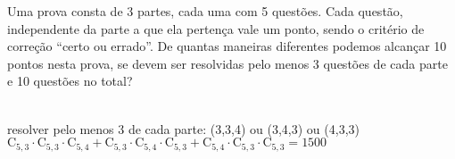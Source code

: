 \begin{ex}
Uma prova consta de 3 partes, cada uma com 5 questões. Cada questão, independente da parte a que ela pertença vale um ponto, sendo o critério de correção “certo ou errado”. De quantas maneiras diferentes podemos alcançar 10 pontos nesta prova, se devem ser resolvidas pelo menos 3 questões de cada parte e 10 questões no total?
  \begin{sol}
    \phantom{A} \\
    resolver pelo menos 3 de cada parte: (3,3,4) ou (3,4,3) ou (4,3,3) \\
    $\mathrm{C}_{5,3}\cdot\mathrm{C}_{5,3}\cdot\mathrm{C}_{5,4}+\mathrm{C}_{5,3}\cdot\mathrm{C}_{5,4}\cdot\mathrm{C}_{5,3}+\mathrm{C}_{5,4}\cdot\mathrm{C}_{5,3}\cdot\mathrm{C}_{5,3}=1500$
  \end{sol}
\end{ex}